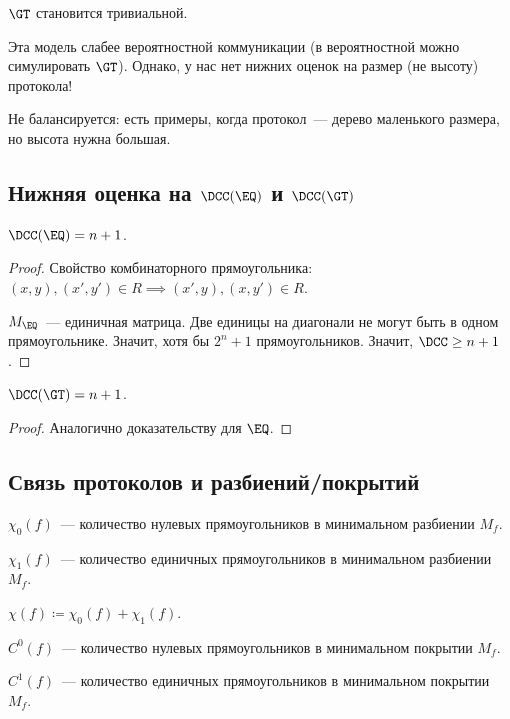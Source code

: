 $\GT$ становится тривиальной.

Эта модель слабее вероятностной коммуникации (в вероятностной можно симулировать $\GT$).
Однако, у нас нет нижних оценок на размер (не высоту) протокола!

Не балансируется: есть примеры, когда протокол~--- дерево маленького размера, но высота нужна большая.

\subsection{Нижняя оценка на \texorpdfstring{$\DCC(\EQ)$}{D(EQ)} и \texorpdfstring{$\DCC(\GT)$}{D(GT)}}

\begin{theorem}
    $\DCC(\EQ) = n + 1$.
\end{theorem}

\begin{proof}
    Свойство комбинаторного прямоугольника: $(x, y), (x', y') \in R \implies\allowbreak (x', y), (x,
    y')\in R$.

    $M_{\EQ}$~--- единичная матрица. Две единицы на диагонали не могут быть в одном
    прямоугольнике. Значит, хотя бы $2^n + 1$ прямоугольников. Значит, $\DCC \ge n + 1$.
\end{proof}


\begin{theorem}
    $\DCC(\GT) = n + 1$.
\end{theorem}

\begin{proof}
    Аналогично доказательству для $\EQ$.
\end{proof}


\subsection{Связь протоколов и разбиений/покрытий}

\begin{definition}
    $\chi_0(f)$~--- количество нулевых прямоугольников в минимальном разбиении $M_f$.

    $\chi_1(f)$~--- количество единичных прямоугольников в минимальном разбиении $M_f$.

    $\chi(f) \coloneqq  \chi_0(f) + \chi_1(f)$.
\end{definition}

\begin{definition}
    $C^0(f)$~--- количество нулевых прямоугольников в минимальном покрытии $M_f$.

    $C^1(f)$~--- количество единичных прямоугольников в минимальном покрытии $M_f$.
\end{definition}

